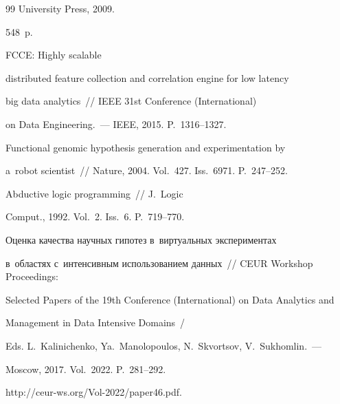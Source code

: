 {{\begin{thebibliography}{99}
University Press, 2009. 


548~p.




 FCCE: Highly scalable 


distributed feature collection and correlation engine for low latency 


big data analytics~/\!\!/ IEEE 31st  Conference (International)


 on Data Engineering.~--- IEEE, 2015. P.~1316--1327.




 Functional genomic hypothesis generation and experimentation by 


a~robot scientist~/\!\!/ Nature, 2004. Vol.~427. Iss.~6971. P.~247--252.




 Abductive logic programming~/\!\!/ J.~Logic 


Comput., 1992. Vol.~2. Iss.~6. P.~719--770.




 Оценка качества научных гипотез в~виртуальных экспериментах 


в~областях с~интенсивным использованием данных~/\!\!/ CEUR Workshop Proceedings: 


Selected Papers of the 19th Conference (International) on Data Analytics and 


Management in Data Intensive Domains~/


Eds. L.~Kalinichenko, Ya.~Manolopoulos, N.~Skvortsov, V.~Sukhomlin.~---


Moscow,   2017. Vol.~2022. P.~281--292.


{\sf http://ceur-ws.org/Vol-2022/paper46.pdf}.





\end{thebibliography}


} }





\vspace*{-3pt}





